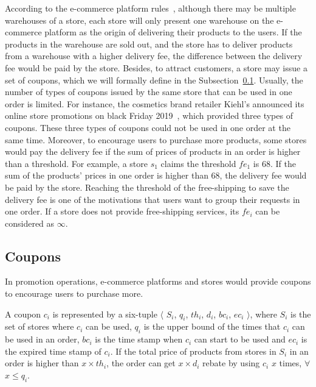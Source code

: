 According to the e-commerce platform rules~\cite{Taobao}, although there may be multiple warehouses of a store, each store will only present one warehouse on the e-commerce platform as the origin of delivering their products to the users. If the products in the warehouse are sold out, and the store has to deliver products from a warehouse with a higher delivery fee, the difference between the delivery fee would be paid by the store. Besides, to attract customers, a store may issue a set of coupons, which we will formally define in the Subsection~\ref{subsec:coupon}. Usually, the number of types of coupons issued by the same store that can be used in one order is limited. For instance, the cosmetics brand retailer Kiehl's announced its online store promotions on black Friday 2019~\cite{Kiehl's}, which provided three types of coupons. These three types of coupons could not be used in one order at the same time. Moreover, to encourage users to purchase more products, some stores would pay the delivery fee if the sum of prices of products in an order is higher than a threshold. For example, a store $s_1$ claims the threshold $fe_1$ is 68. If the sum of the products' prices in one order is higher than 68, the delivery fee would be paid by the store. %
Reaching the threshold of the free-shipping to save the delivery fee is one of the motivations that users want to group their requests in one order. If a store does not provide free-shipping services, its $fe_i$ can be considered as $\infty$.

\subsection{Coupons}
\label{subsec:coupon}
In promotion operations, e-commerce platforms and stores would provide coupons to encourage users to purchase more.

\begin{definition}[A coupon]
	A coupon $c_i$ is represented by a six-tuple $\langle$ $S_i$, $q_i$, $th_i$, $d_i$, $bc_i$, $ec_i$ $\rangle$, where $S_i$ is the set of stores where $c_i$ can be used, $q_i$ is the upper bound of the times that $c_i$ can be used in an order, $bc_i$ is the time stamp when $c_i$ can start to be used and $ec_i$ is the expired time stamp of $c_i$. If the total price of products from stores in $S_i$ in an order is higher than $x \times th_i$, the order can get $x \times d_i$ rebate by using $c_i$ $x$ times, $\forall$ $x \leq q_i$.
	
	\label{def:coupon}
\end{definition}

